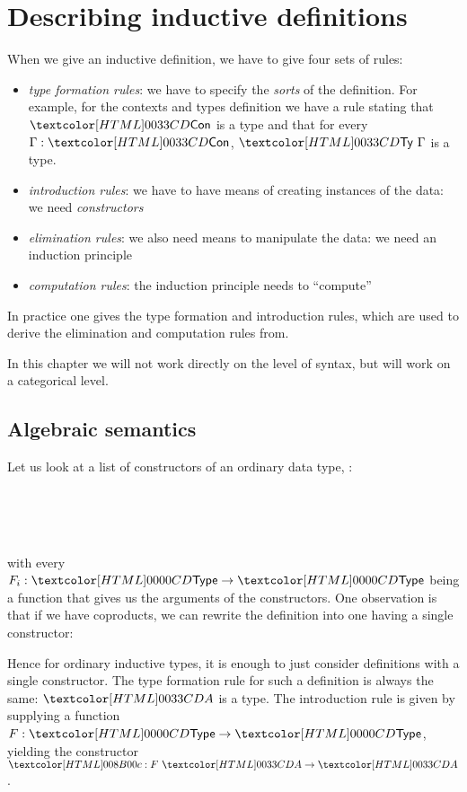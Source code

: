 \chapter{Describing inductive definitions}

When we give an inductive definition, we have to give four sets of
rules:
\begin{itemize}
\item \emph{type formation rules}: we have to specify the \emph{sorts}
  of the definition. For example, for the contexts and types
  definition we have a rule stating that $\ttconty$ is a type and that
  for every $\Gamma : \ttconty$, $\tttyty\ \Gamma$ is a type.
\item \emph{introduction rules}: we have to have means of creating
  instances of the data: we need \emph{constructors}
\item \emph{elimination rules}: we also need means to manipulate the
  data: we need an induction principle
\item \emph{computation rules}: the induction principle needs to ``compute''
\end{itemize}

In practice one gives the type formation and introduction rules, which
are used to derive the elimination and computation rules from.

In this chapter we will not work directly on the level of syntax, but
will work on a categorical level.

\section{Algebraic semantics}

Let us look at a list of constructors of an ordinary data type, \eg:
\begin{datatype}{\Aty}{\Type}
   \\
   \\
  \constrdots \\
\end{datatype}
with every $F_i : \Type \to \Type$ being a function that gives us the
arguments of the constructors. One observation is that if we have
coproducts, we can rewrite the definition into one having a single
constructor:
\begin{datatype}{\Aty}{\Type}
\end{datatype}
Hence for ordinary inductive types, it is enough to just consider
definitions with a single constructor. The type formation rule for
such a definition is always the same: $\Aty$ is a type. The
introduction rule is given by supplying a function
$F : \Type \to \Type$, yielding the constructor
$\Ac : F\ \Aty \to \Aty$.

